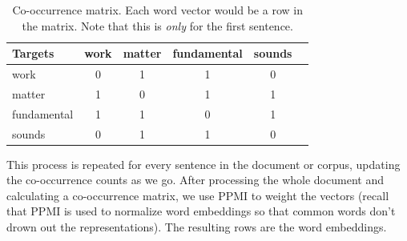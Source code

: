 \begin{table}[h]
    \centering
    \begin{tabular}{|l|c|c|c|c|c|}
    \hline
    Targets & work & matter & fundamental & sounds \\
    \hline
    work & 0 & 1 & 1 & 0 \\
    \hline
    matter & 1 & 0 & 1 & 1  \\
    \hline
    fundamental & 1 & 1 & 0 & 1  \\
    \hline
    sounds & 0 & 1 & 1 & 0  \\
    \hline
    \end{tabular}
    \caption{Co-occurrence matrix. Each word vector would be a row in the matrix. Note that this is \textit{only} for the first sentence.}
    \label{exampleCoocmat}
\end{table}

This process is repeated for every sentence in the document or corpus, updating the co-occurrence counts as we go. After processing the whole document and calculating a co-occurrence matrix, we use PPMI to weight the vectors (recall that PPMI is used to normalize word embeddings so that common words don't drown out the representations). The resulting rows are the word embeddings.
